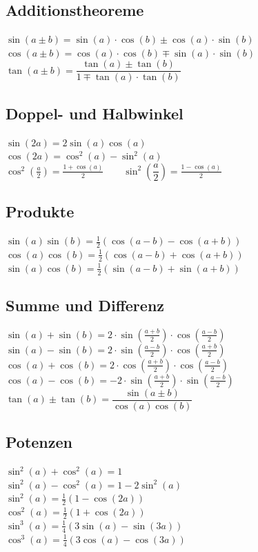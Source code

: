 \begin{multicols}{2}
	\subsection{Additionstheoreme}
	$\sin(a \pm b)=\sin(a) \cdot \cos(b) \pm \cos(a) \cdot \sin(b)$\\
	$\cos(a \pm b)=\cos(a) \cdot \cos(b) \mp \sin(a) \cdot \sin(b)$\\	
	$\tan(a \pm b)=\dfrac{\tan(a) \pm \tan(b)}{1 \mp \tan(a) \cdot \tan(b)}$
	
	\subsection{Doppel- und Halbwinkel}	
	$\sin(2a)=2\sin(a)\cos(a)$\\
	$\cos(2a)=\cos^2(a)-\sin^2(a)$\\
	$\cos^2 \left(\frac{a}{2}\right)=\frac{1+\cos(a)}{2} \qquad
	\sin^2 \left(\dfrac{a}{2}\right)=\frac{1-\cos(a)}{2}$

	\subsection{Produkte}
	$\sin(a)\sin(b)=\frac{1}{2}(\cos(a-b)-\cos(a+b))$\\
	$\cos(a)\cos(b)=\frac{1}{2}(\cos(a-b)+\cos(a+b))$\\
	$\sin(a)\cos(b)=\frac{1}{2}(\sin(a-b)+\sin(a+b))$\\	
	
	\subsection{Summe und Differenz}
	$\sin(a)+\sin(b)=2 \cdot \sin \left(\frac{a+b}{2}\right) \cdot
	\cos\left(\frac{a-b}{2}\right)$\\
	$\sin(a)-\sin(b)=2 \cdot \sin \left(\frac{a-b}{2}\right) \cdot
	\cos\left(\frac{a+b}{2}\right)$\\
	$\cos(a)+\cos(b)=2 \cdot \cos \left(\frac{a+b}{2}\right) \cdot
	\cos\left(\frac{a-b}{2}\right)$\\
	$\cos(a)-\cos(b)=-2 \cdot \sin \left(\frac{a+b}{2}\right) \cdot
	\sin\left(\frac{a-b}{2}\right)$\\
	$\tan(a) \pm \tan(b)=\dfrac{\sin(a \pm b)}{\cos(a)\cos(b)}$\\
	
	\subsection{Potenzen}
	$\sin^2(a)+\cos^2(a)=1$\\
	$\sin^2(a)-\cos^2(a)=1-2\sin^2(a)$\\
	$\sin^2(a)=\frac{1}{2}(1-\cos(2a))$\\
	$\cos^2(a)=\frac{1}{2}(1+\cos(2a))$\\
	$\sin^3(a)=\frac{1}{4}(3\sin(a)-\sin(3a))$\\
	$\cos^3(a)=\frac{1}{4}(3\cos(a)-\cos(3a))$\\
\end{multicols}

